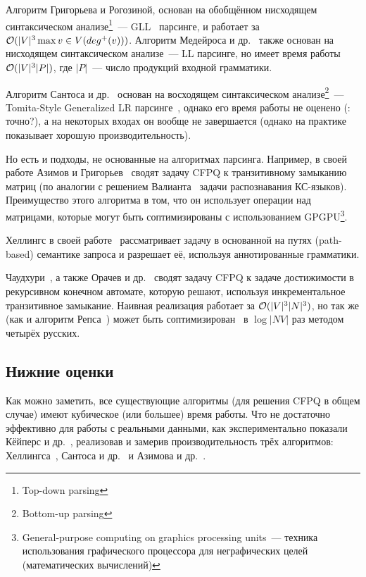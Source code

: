 Алгоритм Григорьева и Рогозиной, основан на обобщённом нисходящем синтаксическом анализе\footnote{Top-down parsing}~--- GLL~\cite{Scott10} парсинге, и работает за $\mathcal{O}(|V|^3 \max\limits{v \in V} (deg^{+}(v)))$. Алгоритм Медейроса и др.~\cite{Medeiros18} также основан на нисходящем синтаксическом анализе~--- LL парсинге, но имеет время работы $\mathcal{O}(|V|^3 |P|)$, где $|P|$~--- число продукций входной грамматики.

Алгоритм Сантоса и др.~\cite{Santos18} основан на восходящем синтаксическом анализе\footnote{Bottom-up parsing}~--- Tomita-Style Generalized LR парсинге~\cite{Scott00}, однако его время работы не оценено (\TODO: точно?), а на некоторых входах он вообще не завершается (однако на практике показывает хорошую производительность). 

Но есть и подходы, не основанные на алгоритмах парсинга. 
Например, в своей работе Азимов и Григорьев~\cite{Santos18} сводят задачу CFPQ к транзитивному замыканию матриц (по аналогии с решением Валианта~\cite{Valiant1975} задачи распознавания КС-языков). Преимущество этого алгоритма в том, что он использует операции над матрицами, которые могут быть соптимизированы с использованием GPGPU\footnote{General-purpose computing on graphics processing units~--- техника использования графического процессора для неграфических целей (математических вычислений)}.

Хеллингс в своей работе~\cite{Hellings15} рассматривает задачу в основанной на путях (path-based) семантике запроса и разрешает её, используя аннотированные грамматики.

Чаудхури~\cite{Chaudhuri08}, а также Орачев и др.~\cite{Orachev20} сводят задачу CFPQ к задаче достижимости в рекурсивном конечном автомате, которую решают, используя инкрементальное транзитивное замыкание. Наивная реализация работает за $\mathcal{O}(|V|^3 |N|^3)$, но так же (как и алгоритм Репса~\cite{Reps97,Chaudhuri06}) может быть соптимизирован~\cite{Shemetova21} в $\log |NV|$ раз методом четырёх русских.

\subsection{Нижние оценки}

Как можно заметить, все существующие алгоритмы (для решения CFPQ в общем случае) имеют кубическое (или большее) время работы. Что не достаточно эффективно для работы с реальными данными, как экспериментально показали Кёйперс и др.~\cite{Kuijpers19}, реализовав и замерив производительность трёх алгоритмов: Хеллингса~\cite{Hellings15}, Сантоса и др.~\cite{Santos18} и Азимова и др.~\cite{Santos18}.

